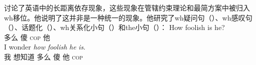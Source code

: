\begin{exe}
\begin{xlist}[iv.]
\begin{exe}
\begin{xlist}[iv.]
 \citet{Sag2010b}讨论了英语中的长距离依存现象，这些现象在管辖约束理论和最简方案\indexmp 中被归入wh移位。他说明了这并非是一种统一的现象。他研究了wh疑问句（）、wh感叹句（）、话题化（）、wh关系化小句（）和the小句（）：
\eal
\ex
\gll How foolish is he?\\
     多么 傻 \textsc{cop} 他\\
\ex
\gll I wonder \emph{how} \emph{foolish} \emph{he} \emph{is}.\\
     我 想知道 多么 傻 他 \textsc{cop}\\
\zl


\end{xlist}
\end{exe}
\end{xlist}
\end{exe}
